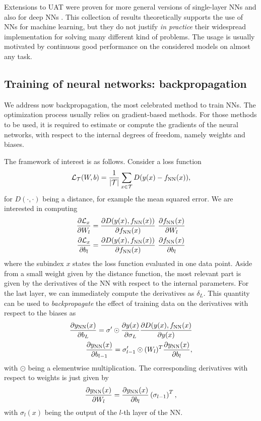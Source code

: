 \documentclass[]{report}
\begin{document}
Extensions to UAT were proven for more general versions of single-layer NNs and also for deep NNs \cite{hornik1991}. This collection of results theoretically supports the use of NNs for machine learning, but they do not justify \textit{in practice} their widespread implementation for solving many different kind of problems. The usage is usually motivated by continuous good performance on the considered models on almost any task. 

\subsection{Training of neural networks: backpropagation}

We address now backpropagation, the most celebrated method to train NNs. The optimization process usually relies on gradient-based methods. For those methods to be used, it is required to estimate or compute the gradients of the neural networks, with respect to the internal degrees of freedom, namely weights and biases. 

The framework of interest is as follows. Consider a loss function
\begin{equation}
\mathcal L_{\mathcal T}(W, b)= \frac{1}{\vert \mathcal T \vert} \sum_{x \in \mathcal T} D(y(x) - f_{\rm NN}(x)), 
\end{equation}
for $D(\cdot, \cdot)$ being a distance, for example the mean squared error. We are interested in computing
\begin{align}
\frac{\partial \mathcal L_x}{\partial W_l} = \frac{\partial D(y(x), f_{\rm NN}(x))}{\partial f_{\rm NN}(x)} \ \frac{\partial f_{\rm NN}(x)}{\partial W_l}\\
\frac{\partial \mathcal L_x}{\partial b_l} = \frac{\partial D(y(x), f_{\rm NN}(x))}{\partial f_{\rm NN}(x)} \ \frac{\partial f_{\rm NN}(x)}{\partial b_l}\\
\end{align}
where the subindex $x$ states the loss function evaluated in one data point. Aside from a small weight given by the distance function, the most relevant part is given by the derivatives of the NN with respect to the internal parameters. For the last layer, we can immediately compute the derivatives as $\delta_L$. This quantity can be used to \textit{backpropagate} the effect of training data on the derivatives with respect to the biases as
\begin{align}
\frac{\partial y_{\rm NN}(x)}{\partial b_L} = \sigma^\prime \odot \frac{\partial y(x)}{\partial \sigma_L} \frac{\partial D(y(x), f_{\rm NN}(x)}{\partial y(x)} \\
\frac{\partial y_{\rm NN}(x)}{\partial b_{l - 1}} = \sigma_{l - 1}^\prime \odot (W_l)^T \frac{\partial y_{\rm NN}(x)}{\partial b_l}, 
\end{align}
with $\odot$ being a elementwise multiplication.
The corresponding derivatives with respect to weights is just given by
\begin{equation}
\frac{\partial y_{\rm NN}(x)}{\partial W_l} = \frac{\partial y_{\rm NN}(x)}{\partial b_l} \left(\sigma_{l - 1}\right)^T,
\end{equation}
with $\sigma_l(x)$ being the output of the $l$-th layer of the NN. 
\end{document}
